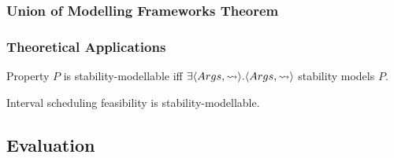 \documentclass[11pt]{beamer}
\begin{document}
	\begin{frame}
		\frametitle{Union of Modelling Frameworks Theorem}
		\begin{center}
			\resizebox{0.9\textwidth}{!}{}		
		\end{center}
	\end{frame}

	\begin{frame}
		\frametitle{Theoretical Applications}
		\begin{definition}
			Property $P$ is stability-modellable iff $\exists\langle{Args},{\rightsquigarrow}\rangle.\langle{Args},{\rightsquigarrow}\rangle$ stability models $P$.
		\end{definition}
		\begin{theorem}
			\textnormal{Interval scheduling feasibility is stability-modellable.}
		\end{theorem}
	\end{frame}

	\subsection{Evaluation}
\end{document}
